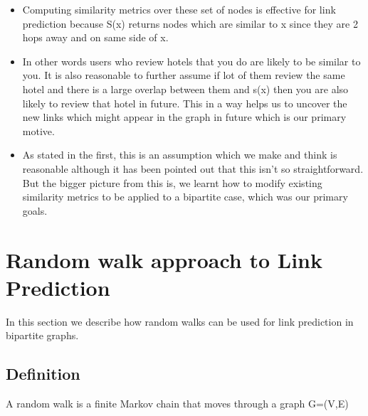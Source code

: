 \documentclass[letterpaper,twocolumn,11pt]{article}
\begin{document}
\begin{itemize}
\item Computing similarity metrics over these set of nodes is effective for link prediction because S(x) returns nodes which are similar to x since they are 2 hops away and on same side of x.

\item In other words users who review hotels that you do are likely to be similar to you. It is also reasonable to further assume if lot of them review the same hotel and there is a large overlap between them and s(x) then you are also likely to review that hotel in future. This in a way helps us to uncover the new links which might appear in the graph in future which is our primary motive.

\item As stated in the first, this is an assumption which we make and think is reasonable although it has been pointed out that this isn't so straightforward. But the bigger picture from this is, we learnt how to modify existing similarity metrics to be applied to a bipartite case, which was our primary goals.

\end{itemize}

\section{Random walk approach to Link Prediction}

In this section we describe how random walks can be used for link prediction in bipartite graphs.

\subsection{Definition}
A random walk is a finite Markov chain that moves through a graph G=(V,E)
\end{document}
